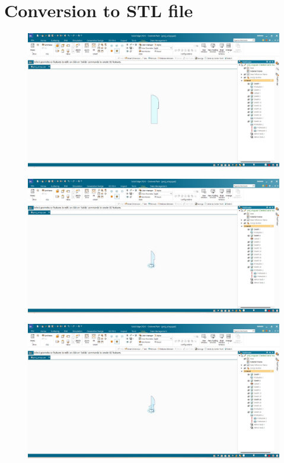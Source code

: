 \documentclass{article}
\begin{document}
\section{Conversion to STL file}
\begin{figure}[H]
\centering
\includegraphics[scale = 0.3 ]{./figs/1.jpeg}
\end{figure}
\begin{figure}[H]
\centering
\includegraphics[scale = 0.3 ]{./figs/2.jpeg}
\end{figure}\begin{figure}[H]
\centering
\includegraphics[scale = 0.3 ]{./figs/3.jpeg}
\end{figure}
\end{document}
